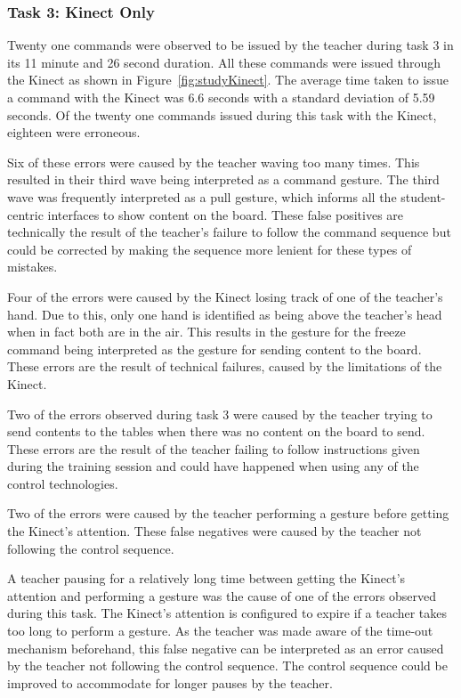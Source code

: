 \documentclass[link]{IWCOMP}
\begin{document}
\subsubsection{Task 3: Kinect Only}
\label{subsubsec:studyPhase1ResultsTask3}

Twenty one commands were observed to be issued by the teacher during task 3 in its 11 minute and 26 second duration.
All these commands were issued through the Kinect as shown in Figure~\ref{fig:studyKinect}.
The average time taken to issue a command with the Kinect was 6.6 seconds with a standard deviation of 5.59 seconds.
Of the twenty one commands issued during this task with the Kinect, eighteen were erroneous.

Six of these errors were caused by the teacher waving too many times.
This resulted in their third wave being interpreted as a command gesture.
The third wave was frequently interpreted as a pull gesture, which informs all the student-centric interfaces to show content on the board.
These false positives are technically the result of the teacher's failure to follow the command sequence but could be corrected by making the sequence more lenient for these types of mistakes.

Four of the errors were caused by the Kinect losing track of one of the teacher's hand.
Due to this, only one hand is identified as being above the teacher's head when in fact both are in the air.
This results in the gesture for the freeze command being interpreted as the gesture for sending content to the board.
These errors are the result of technical failures, caused by the limitations of the Kinect.

Two of the errors observed during task 3 were caused by the teacher trying to send contents to the tables when there was no content on the board to send.
These errors are the result of the teacher failing to follow instructions given during the training session and could have happened when using any of the control technologies.

Two of the errors were caused by the teacher performing a gesture before getting the Kinect's attention.
These false negatives were caused by the teacher not following the control sequence.

A teacher pausing for a relatively long time between getting the Kinect's attention and performing a gesture was the cause of one of the errors observed during this task.
The Kinect's attention is configured to expire if a teacher takes too long to perform a gesture.
As the teacher was made aware of the time-out mechanism beforehand, this false negative can be interpreted as an error caused by the teacher not following the control sequence.
The control sequence could be improved to accommodate for longer pauses by the teacher.
\end{document}
